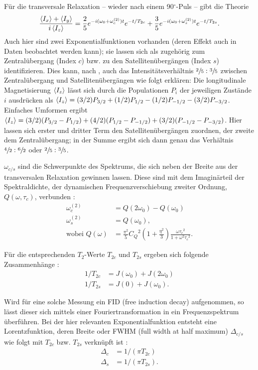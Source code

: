 Für die transversale Relaxation -- wieder nach einem 90$^\circ$-Puls -- gibt die Theorie \cite{werbelow}
\begin{align}
    \frac{\Braket{I_x} + \Braket{I_y}}{i\Braket{I_z}} = \frac{2}{5}e^{-i(\omega_0 + \omega_c^{(2)})t}e^{-t/T_{2c}} + \frac{3}{5}e^{-i(\omega_0 + \omega_s^{(2)})t}e^{-t/T_{2s}}. \label{eqn:trans_relax}
\end{align}
Auch hier sind zwei Exponentialfunktionen vorhanden (deren Effekt auch in Daten beobachtet werden kann); sie lassen sich als zugehörig zum Zentralübergang (Index $c$) bzw. zu den Satellitenübergängen (Index $s$) identifizieren. Dies kann, nach \cite{werbelow}, auch das Intensitätsverhältnis $\sfrac{2}{5}:\sfrac{3}{5}$ zwischen Zentralübergang und Satellitenübergängen wie folgt erklären: Die longitudinale Magnetisierung $\Braket{I_z}$ lässt sich durch die Populationen $P_i$ der jeweiligen Zustände $i$ ausdrücken als $\Braket{I_z} = (3/2)P_{3/2} + (1/2)P_{1/2} - (1/2)P_{-1/2} - (3/2)P_{-3/2}$. Einfaches Umformen ergibt $\Braket{I_z} = (3/2)(P_{3/2} - P_{1/2}) + (4/2)(P_{1/2} - P_{-1/2}) + (3/2)(P_{-1/2} - P_{-3/2})$. Hier lassen sich erster und dritter Term den Satellitenübergängen zuordnen, der zweite dem Zentralübergang; in der Summe ergibt sich dann genau das Verhältnis $\sfrac{4}{2}:\sfrac{6}{2}$ oder $\sfrac{2}{5}:\sfrac{3}{5}$.

$\omega_{c/s}$ sind die Schwerpunkte des Spektrums, die sich neben der Breite aus der transversalen Relaxation gewinnen lassen. Diese sind mit dem Imaginärteil der Spektraldichte, der dynamischen Frequenzverschiebung zweiter Ordnung, $Q(\omega, \tau_c)$, verbunden \cite{eckert}:
\begin{align}
    \omega_c^{(2)} &= Q(2\omega_0) - Q(\omega_0) \label{eqn:schwerpunkt} \\ 
    \omega_s^{(2)} &= Q(\omega_0), \\
    \text{wobei } Q(\omega) &= \frac{\pi^2}{5} {C_Q}^2 \left( 1 + \frac{\eta^2}{3} \right) \frac{\omega {\tau_c}^2}{1 + \omega^2 {\tau_c}^2}.
\end{align}

Für die entsprechenden $T_2$-Werte $T_{2c}$ und $T_{2s}$ ergeben sich folgende Zusammenhänge \cite{eckert}:
\begin{align}
    1/T_{2c} &= J(\omega_0) + J(2\omega_0) \label{eqn:theo:T_2_dyn} \\
    1/T_{2s} &= J(0) + J(\omega_0).
\end{align}

Wird für eine solche Messung ein FID (free induction decay) aufgenommen, so lässt dieser sich mittels einer Fouriertransformation in ein Frequenzspektrum überführen. Bei der hier relevanten Exponentialfunktion entsteht eine Lorentzfunktion, deren Breite oder FWHM (full width at half maximum) $\Delta_{c/s}$ wie folgt mit $T_{2c}$ bzw. $T_{2s}$ verknüpft ist \cite{werbelow}:
\begin{align}
    \Delta_c &= 1/(\pi T_{2c}) \label{eqn:fwhm} \\ 
    \Delta_s &= 1/(\pi T_{2s}).
\end{align}

